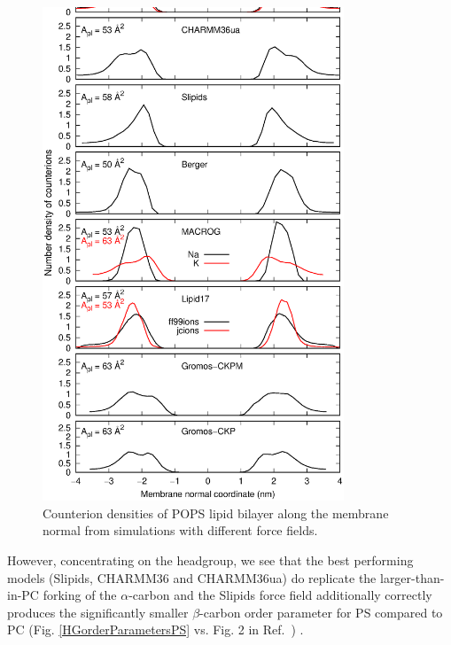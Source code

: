 \documentclass[aps,prl,superscriptaddress,twocolumn]{revtex4}
\begin{document}
\begin{figure}[!htb]
  \centering
  \includegraphics[width=9.0cm]{../Figs/NAdensPOPS.eps}
  \caption{\label{NAdensPOPS}
    Counterion densities of POPS lipid bilayer along the membrane normal from
    simulations with different force fields.
  }
\end{figure}



However, concentrating on the headgroup, we see that the best performing models (Slipids, CHARMM36 and CHARMM36ua) do replicate the larger-than-in-PC forking of the $\alpha$-carbon  and the Slipids force field additionally correctly produces the significantly smaller $\beta$-carbon order parameter for PS compared to PC (Fig. \ref{HGorderParametersPS} vs. Fig. 2 in Ref.~) .
\end{document}
